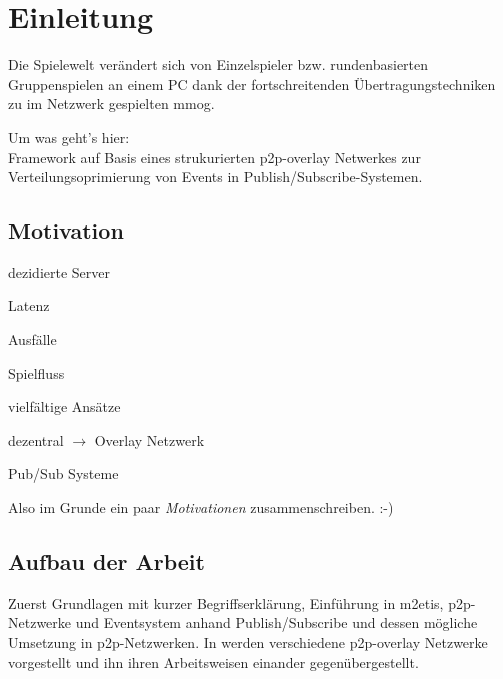 \chapter{Einleitung}
\label{chap:einleitung}

Die Spielewelt verändert sich von Einzelspieler bzw. rundenbasierten Gruppenspielen an einem PC dank der fortschreitenden Übertragungstechniken zu im Netzwerk gespielten \ac{mmog}.

Um was geht's hier:\\
Framework auf Basis eines strukurierten p2p-overlay Netwerkes zur Verteilungsoprimierung von Events in Publish/Subscribe-Systemen.

\section{Motivation}
\begin{itemize*}
\item dezidierte Server
\item Latenz
\item Ausfälle
\item Spielfluss
\end{itemize*}

\begin{itemize*}
\item vielfältige Ansätze \cite{Bharambe2008Donnybrook} %
\item dezentral $\rightarrow$ Overlay Netzwerk
\item Pub/Sub Systeme \cite{Knutsson2004Peertopeer, Triebel2008Peertopeer} %
\end{itemize*}

Also im Grunde ein paar \emph{Motivationen} zusammenschreiben. :-)

\section{Aufbau der Arbeit}
Zuerst Grundlagen mit kurzer Begriffserklärung, Einführung in \ac{m2etis},  p2p-Netzwerke und Eventsystem anhand Publish/Subscribe und dessen mögliche Umsetzung in p2p-Netzwerken. In  werden verschiedene p2p-overlay Netzwerke vorgestellt und ihn ihren Arbeitsweisen einander gegenübergestellt.

